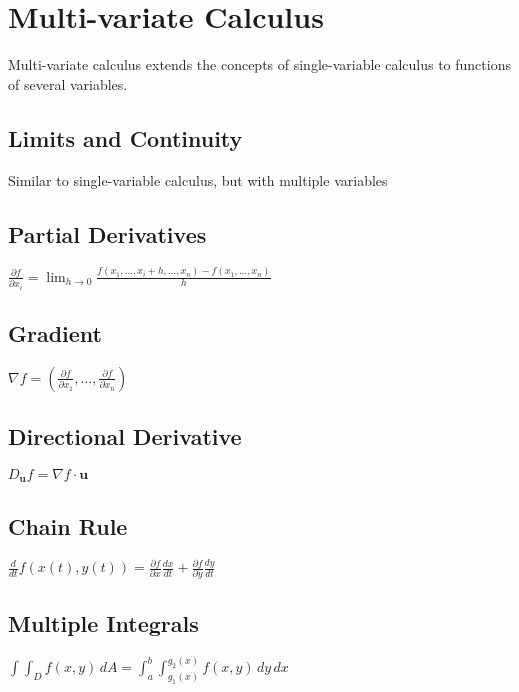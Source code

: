 \documentclass[12pt,a4paper]{article}
\begin{document}
\section{Multi-variate Calculus}
\begin{info-box}
Multi-variate calculus extends the concepts of single-variable calculus to functions of several variables.
\end{info-box}

\subsection{Limits and Continuity}
Similar to single-variable calculus, but with multiple variables

\subsection{Partial Derivatives}
$\frac{\partial f}{\partial x_i} = \lim_{h \to 0} \frac{f(x_1,\ldots,x_i+h,\ldots,x_n) - f(x_1,\ldots,x_n)}{h}$

\subsection{Gradient}
$\nabla f = \left(\frac{\partial f}{\partial x_1}, \ldots, \frac{\partial f}{\partial x_n}\right)$

\subsection{Directional Derivative}
$D_\mathbf{u}f = \nabla f \cdot \mathbf{u}$

\subsection{Chain Rule}
$\frac{d}{dt}f(x(t),y(t)) = \frac{\partial f}{\partial x}\frac{dx}{dt} + \frac{\partial f}{\partial y}\frac{dy}{dt}$

\subsection{Multiple Integrals}
$\int\int_D f(x,y) \,dA = \int_a^b\int_{g_1(x)}^{g_2(x)} f(x,y) \,dy\,dx$
\end{document}
